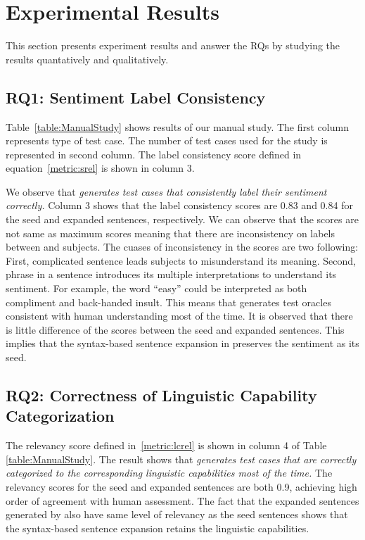 \section{Experimental Results}
\label{sec:result}

This section presents experiment results and answer the RQs by
studying the results quantatively and qualitatively.

\subsection{RQ1: \tool Sentiment Label Consistency}
Table~\ref{table:ManualStudy} shows results of our manual study. The
first column represents type of test case. The number of test cases
used for the study is represented in second column. The label
consistency score defined in equation~\ref{metric:srel} is shown in
column 3.

We observe that \emph{\tool generates test cases that consistently
  label their sentiment correctly.}  Column 3 shows that the label
consistency scores are 0.83 and 0.84 for the seed and expanded
sentences, respectively. We can observe that the scores are not same
as maximum scores meaning that there are inconsistency on labels
between \tool and subjects. The cuases of inconsistency in the scores
are two following: First, complicated sentence leads subjects to
misunderstand its meaning. Second, phrase in a sentence introduces its
multiple interpretations to understand its sentiment. For example, the
word ``easy'' could be interpreted as both compliment and back-handed
insult.  This means that \tool generates test oracles consistent with
human understanding most of the time. It is observed that there is
little difference of the scores between the seed and expanded
sentences. This implies that the syntax-based sentence expansion in
\tool preserves the sentiment as its seed.

\subsection{RQ2: Correctness of Linguistic Capability Categorization}
The \lc relevancy score defined in~\ref{metric:lcrel} is shown in
column 4 of Table \ref{table:ManualStudy}. The result shows that
\emph{\tool generates test cases that are correctly categorized to the
  corresponding linguistic capabilities most of the time.}  The \lc
relevancy scores for the seed and expanded sentences are both 0.9,
achieving high order of agreement with human assessment. The fact that
the expanded sentences generated by \tool also have same level of \lc
relevancy as the seed sentences shows that the syntax-based sentence
expansion retains the linguistic capabilities.


